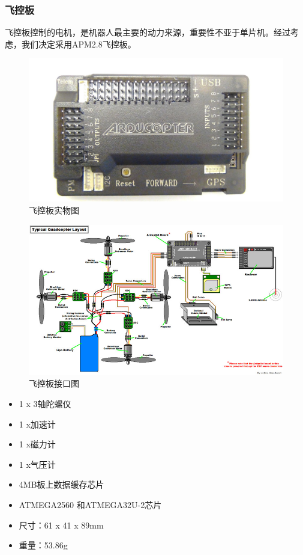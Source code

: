 \documentclass{ctexart}
\begin{document}
\subsubsection{飞控板}
飞控板控制的电机，是机器人最主要的动力来源，重要性不亚于单片机。经过考虑，我们决定采用APM2.8飞控板。
\begin{figure}[H]
\centering
    \includegraphics[width = \textwidth]{037}
    \caption{飞控板实物图}\par
\end{figure}
\begin{figure}[H]
\centering
    \includegraphics[width = \textwidth]{038}
    \caption{飞控板接口图}\par
\end{figure}
\begin{center}
\begin{itemize}
\item 1 x 3轴陀螺仪
\item 1 x加速计
\item 1 x磁力计
\item 1 x气压计
\item 4MB板上数据缓存芯片
\item  ATMEGA2560 和ATMEGA32U-2芯片
\item 尺寸：61 x 41 x 89mm
\item 重量：53.86g
\end{itemize}
\end{center}
\end{document}
